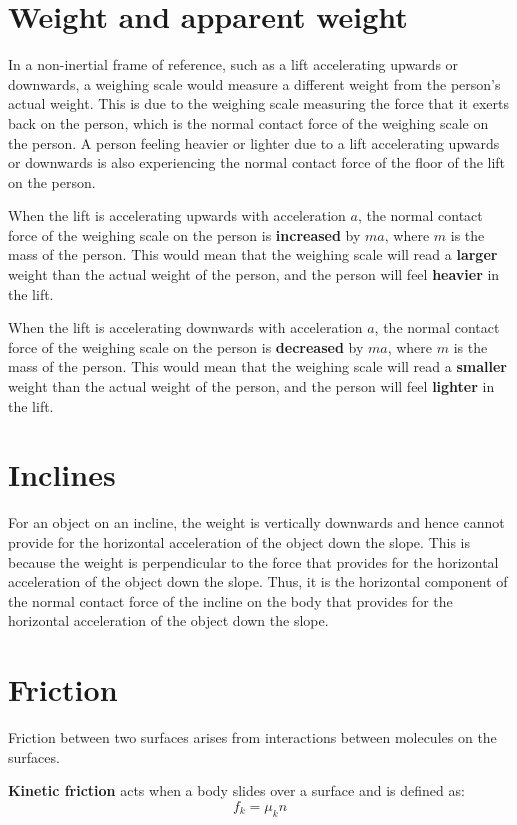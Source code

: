 \documentclass[11pt]{article}
\begin{document}
\section{Weight and apparent weight}
\label{sec:org5918466}
In a non-inertial frame of reference, such as a lift accelerating upwards or downwards, a weighing scale would measure a different weight from the person's actual weight. This is due to the weighing scale measuring the force that it exerts back on the person, which is the normal contact force of the weighing scale on the person. A person feeling heavier or lighter due to a lift accelerating upwards or downwards is also experiencing the normal contact force of the floor of the lift on the person.


When the lift is accelerating upwards with acceleration \(a\), the normal contact force of the weighing scale on the person is \textbf{increased} by \(ma\), where \(m\) is the mass of the person. This would mean that the weighing scale will read a \textbf{larger} weight than the actual weight of the person, and the person will feel \textbf{heavier} in the lift.


When the lift is accelerating downwards with acceleration \(a\), the normal contact force of the weighing scale on the person is \textbf{decreased} by \(ma\), where \(m\) is the mass of the person. This would mean that the weighing scale will read a \textbf{smaller} weight than the actual weight of the person, and the person will feel \textbf{lighter} in the lift.
\section{Inclines}
\label{sec:org26e3084}
For an object on an incline, the weight is vertically downwards and hence cannot provide for the horizontal acceleration of the object down the slope. This is because the weight is perpendicular to the force that provides for the horizontal acceleration of the object down the slope. Thus, it is the horizontal component of the normal contact force of the incline on the body that provides for the horizontal acceleration of the object down the slope.

\newpage
\section{Friction}
\label{sec:org68b2e08}
Friction between two surfaces arises from interactions between molecules on the surfaces.


\textbf{Kinetic friction} acts when a body slides over a surface and is defined as:
\[f_k = \mu_k n\]
\end{document}

